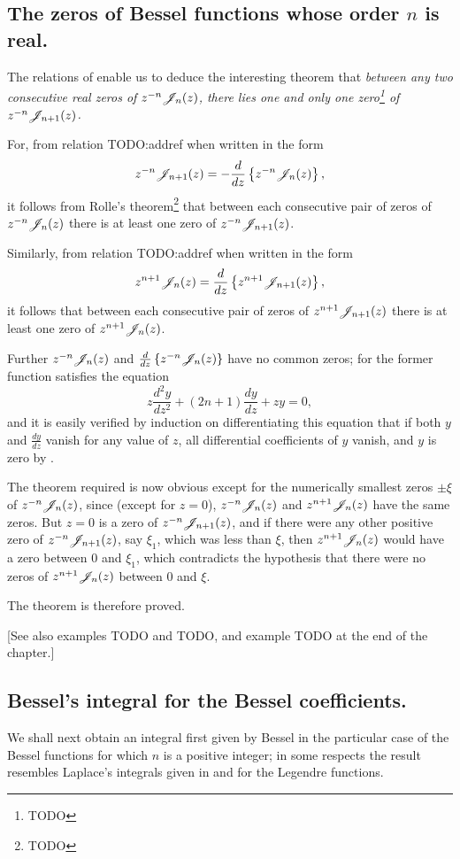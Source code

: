 \documentclass{book}
\begin{document}
\subsection{The zeros of Bessel functions whose order $n$ is real.}
The relations of  enable us to deduce the
interesting theorem that \emph{between any two consecutive real zeros
  of $z^{-n}\mathscr{J}_n(z)$, there lies one and only one zero\footnote{TODO}
  of $z^{-n}\mathscr{J}_{n+1}(z)$.}

For, from relation TODO:addref when written in the form
$$
z^{-n} \mathscr{J}_{n+1}(z) 
= 
- \frac{d}{dz} \left\{  z^{-n} \mathscr{J}_n(z)  \right\},
$$
it follows from Rolle's theorem\footnote{TODO} that between each
consecutive pair of zeros of $z^{-n}\mathscr{J}_n(z)$ there is at least one zero
of $z^{-n} \mathscr{J}_{n+1}(z)$.

Similarly, from relation TODO:addref when written in the form
$$
z^{n+1} \mathscr{J}_n(z) 
= 
\frac{d}{dz} \left\{  z^{n+1} \mathscr{J}_{n+1}(z)  \right\},
$$
it follows that between each consecutive pair of zeros of 
$z^{n+1}\mathscr{J}_{n+1}(z)$ there is at least one zero of 
$z^{n+1}\mathscr{J}_n(z)$.

Further $z^{-n}\mathscr{J}_n(z)$ and 
$\frac{d}{dz} \left\{  z^{-n} \mathscr{J}_n(z)   \right\}$ have no common zeros; for
the former function satisfies the equation
$$
z \frac{d^2 y}{dz^2} + (2n+1) \frac{dy}{dz} + zy = 0,
$$
and it is easily verified by induction on differentiating this
equation that if both $y$ and $\frac{dy}{dz}$ vanish for any value of
$z$, all differential coefficients of $y$ vanish, and $y$ is zero by 
.

The theorem required is now obvious except for the numerically
smallest zeros $\pm \xi$ of $z^{-n}\mathscr{J}_n(z)$, since (except for $z=0$), 
$z^{-n}\mathscr{J}_n(z)$ and $z^{n+1}\mathscr{J}_n(z)$ have the same zeros. But $z=0$ is a
zero of $z^{-n}\mathscr{J}_{n+1}(z)$, and if there were any other positive zero
of $z^{-n}\mathscr{J}_{n+1}(z)$, say $\xi_1$, which was less than $\xi$, then
$z^{n+1}\mathscr{J}_n(z)$ would have a zero between $0$ and $\xi_1$, which
contradicts the hypothesis that there were no zeros of 
$z^{n+1}\mathscr{J}_n(z)$ between $0$ and $\xi$.

The theorem is therefore proved.

[See also  examples TODO and TODO, and example
TODO at the end of the chapter.]
%
%
\subsection{Bessel's integral for the Bessel coefficients.}
We shall next obtain an integral first given by Bessel in the
particular case of the Bessel functions for which $n$ is a positive
integer; in some respects the result resembles Laplace's integrals
given in  and 
for the Legendre functions.
\end{document}
